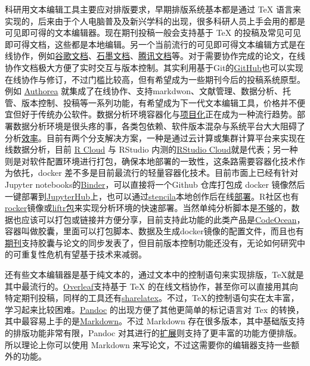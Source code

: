 \documentclass[]{tufte-book}
\begin{document}
科研用文本编辑工具主要应对排版要求，早期排版系统基本都是通过 TeX 语言来实现的，后来由于个人电脑普及及新兴学科的出现，很多科研人员上手会用的都是可见即可得的文本编辑器。现在期刊投稿一般会支持基于 TeX 的投稿及常见可见即可得文档，这些都是本地编辑。另一个当前流行的可见即可得文本编辑方式是在线协作，例如\href{https://docs.google.com/}{谷歌文档}、\href{https://shimo.im/}{石墨文档}、\href{https://docs.qq.com/}{腾讯文档}等。对于需要协作完成的论文，在线协作文档极大方便了实时交互与版本控制。其实利用基于Git的\href{https://github.com/}{GitHub}也可以实现在线协作与修订，不过门槛比较高，但有希望成为一些期刊今后的投稿系统原型。例如 \href{https://www.authorea.com}{Authorea} 就集成了在线协作、支持markdwon、文献管理、数据分析、托管、版本控制、投稿等一系列功能，有希望成为下一代文本编辑工具，价格并不便宜但好于传统办公软件。数据分析环境容器化与\href{https://my.scinote.net/projects}{项目化}正在成为一种流行趋势。部署数据分析环境是很头疼的事，各类包依赖、软件版本混杂与系统平台大大阻碍了分析\href{https://www.nature.com/news/1-500-scientists-lift-the-lid-on-reproducibility-1.19970}{效率}。目前有两个分支解决方案，一种是通过云计算或集群计算平台来实现在线数据分析，目前 \href{https://rcloud.social/index.html}{R Cloud} 与 RStudio 内测的\href{https://rstudio.cloud}{RStudio Cloud}就是代表；另一种则是对软件配置环境进行打包，确保本地部署的一致性，这条路需要容器化技术作为依托，docker 差不多是目前最流行的轻量容器化技术。目前市面上已经有针对Jupyter notebooks的\href{https://mybinder.org/}{Binder}，可以直接将一个Github 仓库打包成 docker 镜像然后一键部署到\href{https://jupyterhub.readthedocs.io/en/latest/index.html}{JupyterHub}上，也可以通过\href{https://stenci.la/}{stencila}本地创作后在线\href{https://github.com/minrk/nbstencilaproxy}{部署}。R社区也有\href{https://www.rocker-project.org/}{rocker}镜像或\href{https://cran.r-project.org/web/packages/liftr/vignettes/liftr-intro.html}{liftr包}来实现分析环境的快速部署。当然单纯分析脚本是\href{https://markwoodbridge.com/2017/03/05/jupyter-reproducible-science.html}{不够}的，数据也应该可以打包或链接并方便分享，目前支持此功能的此类产品是\href{https://codeocean.com}{CodeOcean}，容器叫做胶囊，里面可以打包脚本、数据及生成docker镜像的配置文件，而且也有\href{https://f1000research.com/articles/4-121/v1}{期刊}支持胶囊与论文的同步发表了，但目前版本控制功能还没有，无论如何研究中的可重复性危机有望基于技术来减弱。

还有些文本编辑器是基于纯文本的，通过文本中的控制语句来实现排版，TeX就是其中最流行的。\href{https://www.overleaf.com/}{Overleaf}支持基于 TeX 的在线文档协作，甚至你可以直接用其向特定期刊投稿，同样的工具还有\href{https://www.sharelatex.com/}{sharelatex}。不过，TeX的控制语句实在太丰富，学习起来比较困难。\href{https://pandoc.org/}{Pandoc} 的出现方便了其他更简单的标记语言对 Tex 的转换，其中最容易上手的是\href{https://daringfireball.net/projects/markdown/}{Markdown}。不过 Markdown 存在很多版本，其中基础版支持的排版功能非常有限，Pandoc 对其进行的\href{https://pandoc.org/MANUAL.html\#pandocs-markdown}{扩展}则支持了更丰富的功能方便排版。所以理论上你可以使用 Markdown 来写论文，不过这需要你的编辑器支持一些额外的功能。
\end{document}
